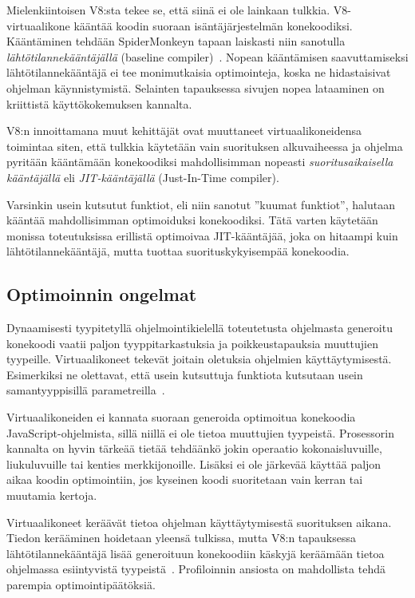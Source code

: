 Mielenkiintoisen V8:sta tekee se, että siinä ei ole lainkaan tulkkia. V8-virtuaalikone kääntää koodin suoraan isäntäjärjestelmän konekoodiksi. Kääntäminen tehdään SpiderMonkeyn tapaan laiskasti niin sanotulla \textit{lähtötilannekääntäjällä} (baseline compiler)~\cite{v8design}. Nopean kääntämisen saavuttamiseksi lähtötilannekääntäjä ei tee monimutkaisia optimointeja, koska ne hidastaisivat ohjelman käynnistymistä. Selainten tapauksessa sivujen nopea lataaminen on kriittistä käyttökokemuksen kannalta.

V8:n innoittamana muut kehittäjät ovat muuttaneet virtuaalikoneidensa toimintaa siten, että tulkkia käytetään vain suorituksen alkuvaiheessa ja ohjelma pyritään kääntämään konekoodiksi mahdollisimman nopeasti \textit{suoritusaikaisella kääntäjällä} eli \textit{JIT-kääntäjällä} (Just-In-Time compiler).

Varsinkin usein kutsutut funktiot, eli niin sanotut ''kuumat funktiot'', halutaan kääntää mahdollisimman optimoiduksi konekoodiksi. Tätä varten käytetään monissa toteutuksissa erillistä optimoivaa JIT-kääntäjää, joka on hitaampi kuin lähtötilannekääntäjä, mutta tuottaa suorituskykyisempää konekoodia.

\subsection{Optimoinnin ongelmat}

Dynaamisesti tyypitetyllä ohjelmointikielellä toteutetusta ohjelmasta generoitu konekoodi vaatii paljon tyyppitarkastuksia ja poikkeustapauksia muuttujien tyypeille. Virtuaalikoneet tekevät joitain oletuksia ohjelmien käyttäytymisestä. Esimerkiksi ne olettavat, että usein kutsuttuja funktiota kutsutaan usein samantyyppisillä parametreilla~\cite[s.~2]{jsanalysis}.

Virtuaalikoneiden ei kannata suoraan generoida optimoitua konekoodia JavaScript-ohjelmista, sillä niillä ei ole tietoa muuttujien tyypeistä. Prosessorin kannalta on hyvin tärkeää tietää tehdäänkö jokin operaatio kokonaisluvuille, liukuluvuille tai kenties merkkijonoille. Lisäksi ei ole järkevää käyttää paljon aikaa koodin optimointiin, jos kyseinen koodi suoritetaan vain kerran tai muutamia kertoja.

Virtuaalikoneet keräävät tietoa ohjelman käyttäytymisestä suorituksen aikana. Tiedon kerääminen hoidetaan yleensä tulkissa, mutta V8:n tapauksessa lähtötilannekääntäjä lisää generoituun konekoodiin käskyjä keräämään tietoa ohjelmassa esiintyvistä tyypeistä~\cite{v8compilers}. Profiloinnin ansiosta on mahdollista tehdä parempia optimointipäätöksiä.

